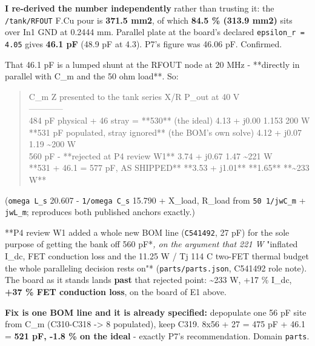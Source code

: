\documentclass[11pt,a4paper]{article}
\begin{document}
\textbf{I re-derived the number independently} rather than trusting it: the \texttt{/tank/RFOUT} F.Cu pour is \textbf{371.5 mm2}, of which \textbf{84.5 \% (313.9 mm2)} sits over In1 GND at 0.2444 mm. Parallel plate at the board's declared \texttt{epsilon\_r = 4.05} gives \textbf{46.1 pF} (48.9 pF at 4.3). P7's figure was 46.06 pF. Confirmed.

That 46.1 pF is a lumped shunt at the RFOUT node at 20 MHz - {*}{*}directly in parallel with C\_m and the 50 ohm load{*}{*}. So:

\begin{quote}\small\ttfamily\raggedright
\textbar{} C\_m \textbar{} Z presented to the tank \textbar{} series X/R \textbar{} P\_out at 40 V \textbar{}\\
\textbar{}---\textbar{}---\textbar{}---\textbar{}---\textbar{}\\
\textbar{} 484 pF physical + 46 stray = {*}{*}530{*}{*} (the ideal) \textbar{} 4.13 + j0.00 \textbar{} 1.153 \textbar{} 200 W \textbar{}\\
\textbar{} {*}{*}531 pF populated, stray ignored{*}{*} (the BOM's own solve) \textbar{} 4.12 + j0.07 \textbar{} 1.19 \textbar{} \textasciitilde{}200 W \textbar{}\\
\textbar{} 560 pF - {*}{*}rejected at P4 review W1{*}{*} \textbar{} 3.74 + j0.67 \textbar{} 1.47 \textbar{} \textasciitilde{}221 W \textbar{}\\
\textbar{} {*}{*}531 + 46.1 = 577 pF, AS SHIPPED{*}{*} \textbar{} {*}{*}3.53 + j1.01{*}{*} \textbar{} {*}{*}1.65{*}{*} \textbar{} {*}{*}\textasciitilde{}233 W{*}{*} \textbar{}
\end{quote}
(\texttt{omega L\_s} 20.607 - \texttt{1/omega C\_s} 15.790 + X\_load, R\_load from \texttt{50 \textbar{}\textbar{} 1/jwC\_m} + \texttt{jwL\_m}; reproduces both published anchors exactly.)

{*}{*}P4 review W1 added a whole new BOM line (\texttt{C541492}, 27 pF) for the sole purpose of getting the bank off 560 pF{*}\emph{, on the argument that 221 W }"inflated I\_dc, FET conduction loss and the 11.25 W / Tj 114 C two-FET thermal budget the whole paralleling decision rests on"{*} (\texttt{parts/parts.json}, C541492 role note). The board as it stands lands \textbf{past} that rejected point: \textasciitilde{}233 W, +17 \% I\_dc, \textbf{+37 \% FET conduction loss}, on the board of E1 above.

\textbf{Fix is one BOM line and it is already specified:} depopulate one 56 pF site from C\_m (C310-C318 -\textgreater{} 8 populated), keep C319. 8x56 + 27 = 475 pF + 46.1 = \textbf{521 pF, -1.8 \% on the ideal} - exactly P7's recommendation. Domain \texttt{parts}.
\end{document}
